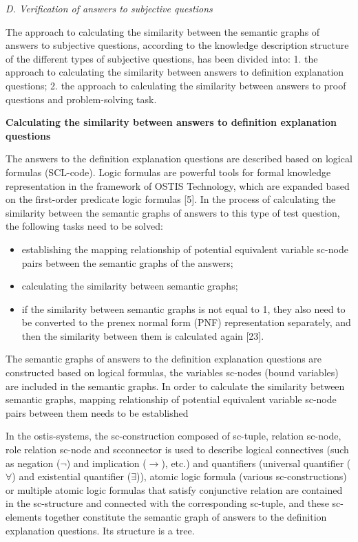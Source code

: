 \documentclass{article}
\begin{document}
\noindent\textit{D. Verification of answers to subjective questions}

The approach to calculating the similarity between the semantic graphs of answers to subjective questions, according to the knowledge description structure of the different types of subjective questions, has been divided into: 1. the approach to calculating the similarity between answers to definition explanation questions; 2. the approach to calculating the similarity between answers to proof questions and problem-solving task.


\textbf{Calculating the similarity between answers to
definition explanation questions}

The answers to the definition explanation questions are described based on logical formulas (SCL-code). Logic formulas are powerful tools for formal knowledge representation in the framework of OSTIS Technology, which are expanded based on the first-order predicate logic formulas [5]. In the process of calculating the similarity between the semantic graphs of answers to this type of test question, the following tasks need to be solved:
\begin{itemize}
    \item establishing the mapping relationship of potential equivalent variable sc-node pairs between the semantic graphs of the answers;
    \item calculating the similarity between semantic graphs;
    \item  if the similarity between semantic graphs is not equal to 1, they also need to be converted to the prenex normal form (PNF) representation separately, and then the similarity between them is calculated again [23].
\end{itemize}

The semantic graphs of answers to the definition
explanation questions are constructed based on logical
formulas, the variables sc-nodes (bound variables) are
included in the semantic graphs. In order to calculate the
similarity between semantic graphs, mapping relationship
of potential equivalent variable sc-node pairs between
them needs to be established

In the ostis-systems, the sc-construction composed of
sc-tuple, relation sc-node, role relation sc-node and scconnector is used to describe logical connectives (such
as negation ($\neg$) and implication ($\rightarrow$), etc.) and quantifiers (universal quantifier ($\forall$) and existential quantifier ($\exists$)), atomic logic formula (various sc-constructions) or multiple atomic logic formulas that satisfy conjunctive relation are contained in the sc-structure and connected with the corresponding sc-tuple, and these sc-elements together constitute the semantic graph of answers to the definition explanation questions. Its structure is a tree.
\end{document}
